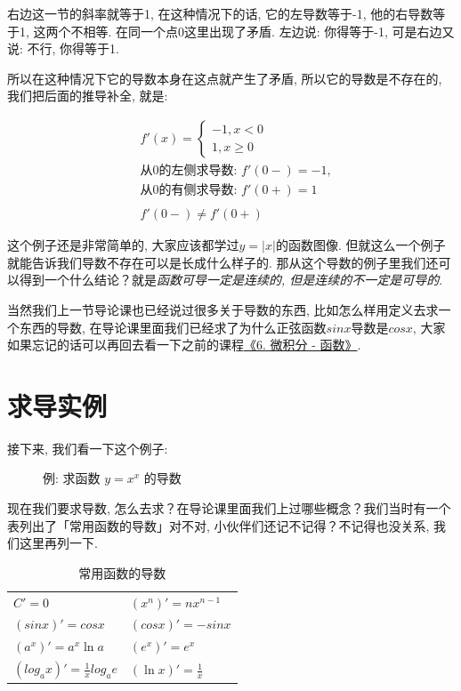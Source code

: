 右边这一节的斜率就等于1, 在这种情况下的话, 它的左导数等于-1, 他的右导数等于1, 这两个不相等. 在同一个点0这里出现了矛盾. 左边说: 你得等于-1, 可是右边又说: 不行, 你得等于1. 

所以在这种情况下它的导数本身在这点就产生了矛盾, 所以它的导数是不存在的, 我们把后面的推导补全, 就是: 

\begin{align*}
  & f'(x) = \begin{cases} -1, x<0 \\ 1, x \geq 0 \end{cases} \\
  & \mbox{从0的左侧求导数: } f'(0-) = -1, \\ 
  & \mbox{从0的有侧求导数: } f'(0+) = 1 \\ \\
  & f'(0-) \neq f'(0+)
\end{align*}

这个例子还是非常简单的, 大家应该都学过$y=|x|$的函数图像. 但就这么一个例子就能告诉我们导数不存在可以是长成什么样子的. 那从这个导数的例子里我们还可以得到一个什么结论？就是\textit{函数可导一定是连续的, 但是连续的不一定是可导的}. 

当然我们上一节导论课也已经说过很多关于导数的东西, 比如怎么样用定义去求一个东西的导数, 在导论课里面我们已经求了为什么正弦函数$sinx$导数是$cosx$, 大家如果忘记的话可以再回去看一下之前的课程\hyperlink{6.微积分-函数}{《6. 微积分 - 函数》}. 

\section{求导实例}

接下来, 我们看一下这个例子: 

\begin{figure}[ht]
  \centering
  \Large{例: 求函数 $y=x^x$ 的导数}
\end{figure}

现在我们要求导数, 怎么去求？在导论课里面我们上过哪些概念？我们当时有一个表列出了「常用函数的导数」对不对, 小伙伴们还记不记得？不记得也没关系, 我们这里再列一下.

\begin{table}
  \centering
  \begin{tabular}{ll}
    \midrule
      $C' = 0$ & $(x^n)' = nx^{n-1}$ \\
      $(sinx)' = cosx$ & $(cosx)' = -sinx$ \\
      $(a^x)' = a^x \ln a$ & $(e^x)' = e^x$ \\
      $(log_a{x})' = \frac{1}{x}log_a{e}$ &  $(\ln x)' = \frac{1}{x}$ \\
    \bottomrule
  \end{tabular}
  \caption{常用函数的导数}
  \label{fig:table10_1}
\end{table}

